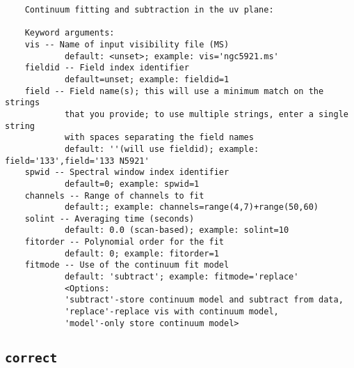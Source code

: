 \small
\begin{verbatim}
    Continuum fitting and subtraction in the uv plane:
    
    Keyword arguments:
    vis -- Name of input visibility file (MS)
            default: <unset>; example: vis='ngc5921.ms'
    fieldid -- Field index identifier
            default=unset; example: fieldid=1
    field -- Field name(s); this will use a minimum match on the strings
            that you provide; to use multiple strings, enter a single string
            with spaces separating the field names
            default: ''(will use fieldid); example: field='133',field='133 N5921'
    spwid -- Spectral window index identifier
            default=0; example: spwid=1
    channels -- Range of channels to fit
            default:; example: channels=range(4,7)+range(50,60)
    solint -- Averaging time (seconds)
            default: 0.0 (scan-based); example: solint=10
    fitorder -- Polynomial order for the fit
            default: 0; example: fitorder=1
    fitmode -- Use of the continuum fit model
            default: 'subtract'; example: fitmode='replace'
            <Options: 
            'subtract'-store continuum model and subtract from data,
            'replace'-replace vis with continuum model,
            'model'-only store continuum model>
\end{verbatim}
\normalsize


\subsection{{\tt correct}}
\label{section:tasks.correct}

